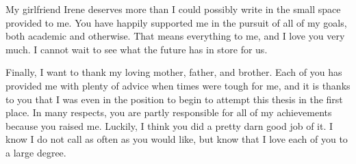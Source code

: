 \documentclass{ucbthesis}
\begin{document}
\begin{frontmatter}
\begin{acknowledgements}
My girlfriend Irene deserves more than I could possibly write in the small space provided to me. 
You have happily supported me in the pursuit of all of my goals, both academic and otherwise. 
That means everything to me, and I love you very much. I cannot wait to see what the future has in store for us. 

Finally, I want to thank my loving mother, father, and brother. 
Each of you has provided me with plenty of advice when times were tough for me, and it is thanks to you that I was even in the position to begin to attempt this thesis in the first place.
In many respects, you are partly responsible for all of my achievements because you raised me. 
Luckily, I think you did a pretty darn good job of it. 
I know I do not call as often as you would like, but know that I love each of you to a large degree. 
\end{acknowledgements}

\end{frontmatter}

\pagestyle{headings}










\printbibliography
\end{document}
